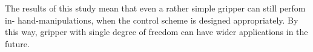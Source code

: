 The results of this study mean that even a rather simple gripper can still perfom in- hand-manipulations,
when the control scheme is designed appropriately.
By this way, gripper with single degree of freedom can have wider applications in the future.


